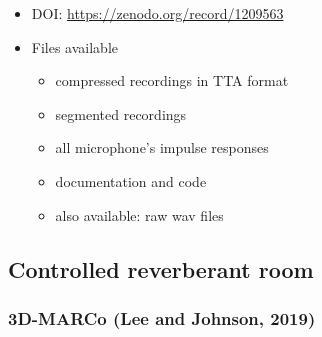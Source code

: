 \documentclass[14pt, oneside]{extarticle}
\begin{document}
\begin{itemize}
\item DOI: \href{10.5281/zenodo.1209563}{https://zenodo.org/record/1209563} 

\item Files available
	\begin{itemize}
	\item compressed recordings in TTA format
	\item segmented recordings
	\item all microphone's impulse responses
	\item documentation and code
	\item also available: raw wav files
	\end{itemize}

\end{itemize}

\subsection{Controlled reverberant room}

\subsubsection{3D-MARCo (Lee and Johnson, 2019)}
\end{document}
